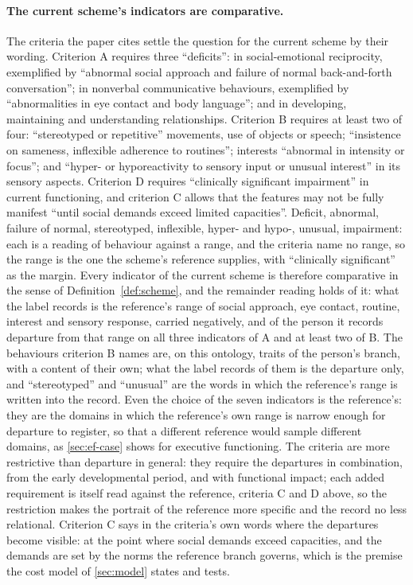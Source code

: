 \paragraph{The current scheme's indicators are comparative.} The criteria the paper cites \cite{APA2013} settle the question for the current scheme by their wording. Criterion A requires three ``deficits'': in social-emotional reciprocity, exemplified by ``abnormal social approach and failure of normal back-and-forth conversation''; in nonverbal communicative behaviours, exemplified by ``abnormalities in eye contact and body language''; and in developing, maintaining and understanding relationships. Criterion B requires at least two of four: ``stereotyped or repetitive'' movements, use of objects or speech; ``insistence on sameness, inflexible adherence to routines''; interests ``abnormal in intensity or focus''; and ``hyper- or hyporeactivity to sensory input or unusual interest'' in its sensory aspects. Criterion D requires ``clinically significant impairment'' in current functioning, and criterion C allows that the features may not be fully manifest ``until social demands exceed limited capacities''. Deficit, abnormal, failure of normal, stereotyped, inflexible, hyper- and hypo-, unusual, impairment: each is a reading of behaviour against a range, and the criteria name no range, so the range is the one the scheme's reference supplies, with ``clinically significant'' as the margin. Every indicator of the current scheme is therefore comparative in the sense of Definition~\ref{def:scheme}, and the remainder reading holds of it: what the label records is the reference's range of social approach, eye contact, routine, interest and sensory response, carried negatively, and of the person it records departure from that range on all three indicators of A and at least two of B. The behaviours criterion B names are, on this ontology, traits of the person's branch, with a content of their own; what the label records of them is the departure only, and ``stereotyped'' and ``unusual'' are the words in which the reference's range is written into the record. Even the choice of the seven indicators is the reference's: they are the domains in which the reference's own range is narrow enough for departure to register, so that a different reference would sample different domains, as \autoref{sec:ef-case} shows for executive functioning. The criteria are more restrictive than departure in general: they require the departures in combination, from the early developmental period, and with functional impact; each added requirement is itself read against the reference, criteria C and D above, so the restriction makes the portrait of the reference more specific and the record no less relational. Criterion C says in the criteria's own words where the departures become visible: at the point where social demands exceed capacities, and the demands are set by the norms the reference branch governs, which is the premise the cost model of \autoref{sec:model} states and tests.
